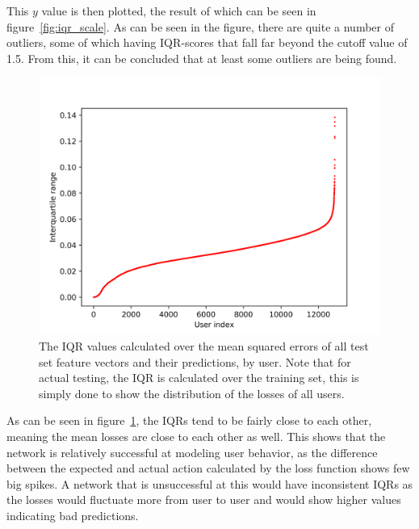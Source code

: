 This \(y\) value is then plotted, the result of which can be seen in figure~\ref{fig:iqr_scale}. As can be seen in the figure, there are quite a number of outliers, some of which having IQR-scores that fall far beyond the cutoff value of 1.5. From this, it can be concluded that at least some outliers are being found. 

\begin{figure}
	\begin{center}
		\includegraphics[scale=1.6]{results/iqrs}
	\end{center}
	\caption{The IQR values calculated over the mean squared errors of all test set feature vectors and their predictions, by user. Note that for actual testing, the IQR is calculated over the training set, this is simply done to show the distribution of the losses of all users.~\label{fig:iqrs}}
\end{figure}

As can be seen in figure~\ref{fig:iqrs}, the IQRs tend to be fairly close to each other, meaning the mean losses are close to each other as well. This shows that the network is relatively successful at modeling user behavior, as the difference between the expected and actual action calculated by the loss function shows few big spikes. A network that is unsuccessful at this would have inconsistent IQRs as the losses would fluctuate more from user to user and would show higher values indicating bad predictions.

